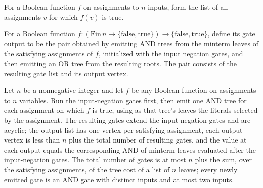 \begin{definition}
\label{BoolCircuit.satList}
\leanok
For a Boolean function $f$ on assignments to $n$ inputs, form the list of all
assignments $v$ for which $f(v)$ is true.
\end{definition}

\begin{definition}
\label{BoolCircuit.dnfGates}
\leanok
{}
For a Boolean function $f\colon
(\mathrm{Fin}\,n\to\{\mathrm{false},\mathrm{true}\})\to\{\mathrm{false},\mathrm{true}\}$,
define its gate output to be the pair obtained by emitting AND trees from the minterm
leaves of the satisfying assignments of $f$, initialized with the input negation gates,
and then emitting an OR tree from the resulting roots. The pair consists of the
resulting gate list and its output vertex.
\end{definition}

\begin{theorem}
\label{BoolCircuit.minterms_spec}
\leanok
{}
Let $n$ be a nonnegative integer and let $f$ be any Boolean function on assignments to
$n$ variables. Run the input-negation gates first, then emit one AND tree for each
assignment on which $f$ is true, using as that tree's leaves the literals selected by
the assignment. The resulting gates extend the input-negation gates and are acyclic; the
output list has one vertex per satisfying assignment, each output vertex is less than
$n$ plus the total number of resulting gates, and the value at each output equals the
corresponding AND of minterm leaves evaluated after the input-negation gates. The total
number of gates is at most $n$ plus the sum, over the satisfying assignments, of the
tree cost of a list of $n$ leaves; every newly emitted gate is an AND gate with distinct
inputs and at most two inputs.
\end{theorem}


